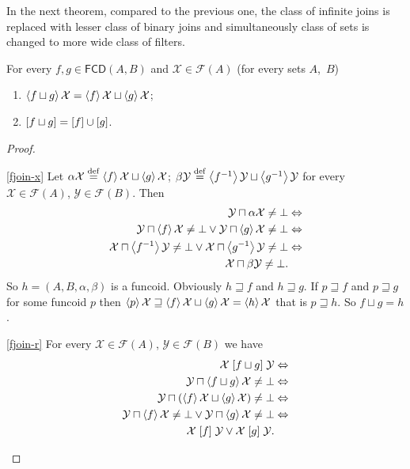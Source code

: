 In the next theorem, compared to the previous one, the class of infinite
joins is replaced with lesser class of binary joins and simultaneously
class of sets is changed to more wide class of filters.
\begin{thm}
\label{fcd-fin-join}For every $f,g\in\mathsf{FCD}(A,B)$ and
$\mathcal{X}\in\mathscr{F}(A)$
(for every sets $A$,~$B$)
\begin{enumerate}
\item \label{fjoin-x}$\left\langle f\sqcup g\right\rangle\mathcal{X}=\left\langle f\right\rangle\mathcal{X}\sqcup\left\langle g\right\rangle\mathcal{X}$;
\item \label{fjoin-r}$\mathord{\mathrel{\left[f\sqcup g\right]}}=\mathord{\mathrel{\left[f\right]}}\cup\mathord{\mathrel{\left[g\right]}}$.
\end{enumerate}
\end{thm}
\begin{proof}
~
\begin{widedisorder}
\item [{\ref{fjoin-x}}] Let $\alpha\mathcal{X}\overset{\mathrm{def}}{=}\left\langle f\right\rangle\mathcal{X}\sqcup\left\langle g\right\rangle\mathcal{X}$;
$\beta\mathcal{Y}\overset{\mathrm{def}}{=}\left\langle f^{-1}\right\rangle\mathcal{Y}\sqcup\left\langle g^{-1}\right\rangle\mathcal{Y
}$
for every $\mathcal{X}\in\mathscr{F}(A)$, $\mathcal{Y}\in\mathscr{F}(B)$.
Then
\begin{align*}
\mathcal{Y}\sqcap\alpha\mathcal{X}\ne\bot & \Leftrightarrow\\
\mathcal{Y}\sqcap\left\langle f\right\rangle\mathcal{X}\ne\bot\lor\mathcal{Y}\sqcap\left\langle g\right\rangle\mathcal{X}\ne\bot & \Leftrightarrow\\
\mathcal{X}\sqcap\left\langle f^{-1}\right\rangle\mathcal{Y}\ne\bot\lor\mathcal{
X}\sqcap\left\langle g^{-1}\right\rangle\mathcal{Y}\ne\bot & \Leftrightarrow\\
\mathcal{X}\sqcap\beta\mathcal{Y}\ne\bot.
\end{align*}
So $h=(A,B,\alpha,\beta)$ is a funcoid. Obviously $h\sqsupseteq f$
and $h\sqsupseteq g$. If $p\sqsupseteq f$ and $p\sqsupseteq g$
for some funcoid $p$ then $\left\langle p\right\rangle\mathcal{X}\sqsupseteq\left\langle f\right\rangle\mathcal{X}\sqcup\left\langle g\right\rangle\mathcal{X}=\left\langle h\right\rangle\mathcal{X}$
that is $p\sqsupseteq h$. So $f\sqcup g=h$.
\item [{\ref{fjoin-r}}] For every $\mathcal{X}\in\mathscr{F}(A)$,
$\mathcal{Y}\in\mathscr{F}(B)$
we have
\begin{align*}
\mathcal{X}\mathrel{\left[f\sqcup g\right]}\mathcal{Y} & \Leftrightarrow\\
\mathcal{Y}\sqcap\left\langle f\sqcup g\right\rangle\mathcal{X}\ne\bot &
\Leftrightarrow\\
\mathcal{Y}\sqcap(\left\langle f\right\rangle\mathcal{X}\sqcup\left\langle g\right\rangle\mathcal{X})\ne\bot & \Leftrightarrow\\
\mathcal{Y}\sqcap\left\langle f\right\rangle\mathcal{X}\ne\bot\lor\mathcal{Y}\sqcap\left\langle g\right\rangle\mathcal{X}\ne\bot & \Leftrightarrow\\
\mathcal{X}\mathrel{\left[f\right]}\mathcal{Y}\lor\mathcal{X}\mathrel{\left[g\right]}\mathcal{Y}.
\end{align*}

\end{widedisorder}
\end{proof}

